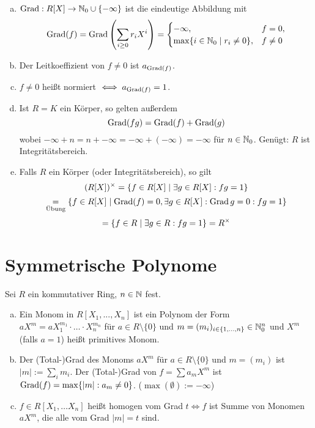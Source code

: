 \documentclass[a4paper]{report}
\begin{document}
\begin{defi}\item
\begin{enumerate}[(a)]
  \item $\grad : R[X] \to \Nn \cup \{- \infty\}$ ist die eindeutige Abbildung mit
        \[\grad(f) = \grad\l( \sum_{i \ge 0}r_{i}X^{i} \r) = \begin{cases} -\infty, & f = 0, \\
                                                          \max\{i \in \Nn \mid r_{i} \ne 0\}, & f \ne 0
                                                        \end{cases}\]
  \item Der Leitkoeffizient von $f \ne 0$ ist $a_{\grad(f)}$.
  \item $f \ne 0$ heißt normiert $\iff a_{\grad(f)} = 1$.
  \item Ist $R = K$ ein Körper, so gelten außerdem
        \[\grad(fg) = \grad(f) + \grad(g)\]
        wobei $-\infty + n = n + -\infty = - \infty + (- \infty) = - \infty$ für $n \in \Nn$. Genügt: $R$ ist Integritätsbereich.
  \item Falls $R$ ein Körper (oder Integritätsbereich), so gilt
        \[(R[X])\en = \{f \in R[X] \mid \ex g \in R[X] : fg = 1\}\]
        \[\ueb = \{f \in R[X] \mid \grad(f) = 0, \ex g \in R[X] : \grad g = 0 : fg = 1\} \]
        \[ = \{f \in R \mid \ex g \in R : fg = 1\} = R\en\]
\end{enumerate}
\end{defi}
\section{Symmetrische Polynome}%
Sei $R$ ein kommutativer Ring, $n \in \N$ fest.
\begin{bez*}
\begin{enumerate}[(a)]
  \item Ein Monom in $R[X_{1}, ..., X_{n}]$ ist ein Polynom der Form $aX^{m} = aX_{1}^{m_{1}}\cdot\ldots\cdot X_{n}^{m_{n}}$ für $a \in R \setminus \{0\}$ und $m = (m_{i})_{i \in \eb n} \in \Nn^{n}$ und $X^{m}$ (falls $a = 1$) heißt primitives Monom.
  \item Der (Total-)Grad des Monoms $aX^{m}$ für $a \in R \setminus \{0\}$ und $m = (m_{i})$ ist $|m| := \sum_{i} m_{i}$. Der (Total-)Grad von $f = \sum a_{m}X^{m}$ ist $\grad(f) = \max\{|m| : a_{m} \ne 0\}$. ($\max(\emptyset) := - \infty$)
  \item $f \in R[X_{1}, \ldots X_{n}]$ heißt homogen vom Grad $t \iff f$ ist Summe von Monomen $aX^{m}$, die alle vom Grad $|m| = t$ sind.
\end{enumerate}
\end{bez*}
\end{document}
